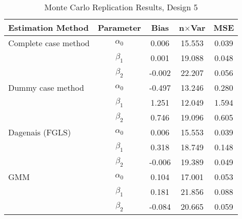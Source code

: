 \begin{table}
\centering
\caption{Monte Carlo Replication Results, Design 5}
\label{table:MCReplicationResultsDesign5}
\begin{tabular}{lcccc}
\toprule
Estimation Method & Parameter & Bias & n$\times$Var & MSE \\
\midrule
Complete case method & $\alpha_0$ & 0.006 & 15.553 & 0.039 \\
 & $\beta_1$ & 0.001 & 19.088 & 0.048 \\
 & $\beta_2$ & -0.002 & 22.207 & 0.056 \\
Dummy case method & $\alpha_0$ & -0.497 & 13.246 & 0.280 \\
 & $\beta_1$ & 1.251 & 12.049 & 1.594 \\
 & $\beta_2$ & 0.746 & 19.096 & 0.605 \\
Dagenais (FGLS) & $\alpha_0$ & 0.006 & 15.553 & 0.039 \\
 & $\beta_1$ & 0.318 & 18.749 & 0.148 \\
 & $\beta_2$ & -0.006 & 19.389 & 0.049 \\
GMM & $\alpha_0$ & 0.104 & 17.001 & 0.053 \\
 & $\beta_1$ & 0.181 & 21.856 & 0.088 \\
 & $\beta_2$ & -0.084 & 20.665 & 0.059 \\
\bottomrule
\end{tabular}
\end{table}
